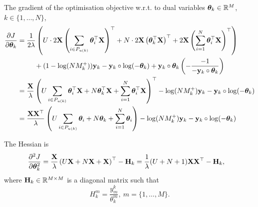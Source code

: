 The gradient of the optimisation objective w.r.t. to dual variables $\bm{\theta}_k \in \mathbb{R}^{M}$, $k \in \{1,\dots,N\}$,
\begin{equation*}
\begin{aligned}
\frac{\partial J}{\partial \bm{\theta}_k}
&= \frac{1}{2 \lambda} \left( U \cdot 2 \mathbf{X} \left(\sum_{i \in P_{u(k)}} \bm{\theta}_i^\top \mathbf{X} \right)^\top 
   + N \cdot 2 \mathbf{X} \left( \bm{\theta}_k^\top \mathbf{X} \right)^\top
   + 2 \mathbf{X} \left(\sum_{i=1}^N \bm{\theta}_i^\top \mathbf{X} \right)^\top \right) \\
& \hspace{2.5em}
   + (1 - \log(N M_k^+)) \mathbf{y}_k - \mathbf{y}_k \circ \log(-\bm{\theta}_k) + \mathbf{y}_k \circ \bm{\theta}_k \left( -\frac{-1}{-\mathbf{y}_k \circ \bm{\theta}_k} \right) \\
&= \frac{\mathbf{X}}{\lambda} \left( U \sum_{i \in P_{u(k)}} \bm{\theta}_i^\top \mathbf{X} 
   + N \bm{\theta}_k^\top \mathbf{X} 
   + \sum_{i=1}^N \bm{\theta}_i^\top \mathbf{X} \right)^\top
   - \log(N M_k^+) \mathbf{y}_k - \mathbf{y}_k \circ \log(-\bm{\theta}_k) \\
&= \frac{\mathbf{X} \mathbf{X}^\top}{\lambda} \left( U \sum_{i \in P_{u(k)}} \bm{\theta}_i + N \bm{\theta}_k + \sum_{i=1}^N \bm{\theta}_i \right)
   - \log(N M_k^+) \mathbf{y}_k - \mathbf{y}_k \circ \log(-\bm{\theta}_k) \\
\end{aligned}
\end{equation*}

The Hessian is
\begin{equation*}
\begin{aligned}
\frac{\partial^2 J}{\partial \bm{\theta}_k^2}
&= \frac{\mathbf{X}}{\lambda} \left( U \mathbf{X} + N \mathbf{X} + \mathbf{X} \right)^\top - \mathbf{H}_k
 = \frac{1}{\lambda} (U + N + 1) \mathbf{X} \mathbf{X}^\top - \mathbf{H}_k,
\end{aligned}
\end{equation*}
where $\mathbf{H}_k \in \mathbb{R}^{M \times M}$ is a diagonal matrix such that
\begin{equation*}
H_k^m = \frac{y_m^k}{\theta_k^m}, \ m = \{1,\dots,M\}.
\end{equation*}
